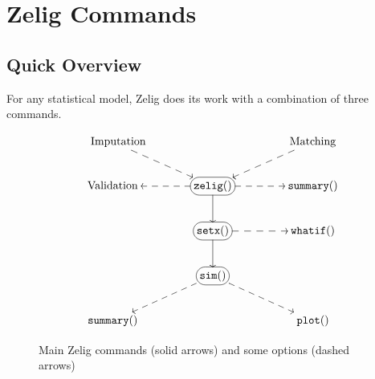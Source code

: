 \section{Zelig Commands}\label{Zcommands}
  
\subsection{Quick Overview}\label{overview}
  
For any statistical model, Zelig does its work with a combination of
three commands.  
\begin{figure}[h!]
\caption{Main Zelig commands (solid arrows) and some options (dashed arrows)}
\label{3steps}
\begin{center}
\begin{displaymath}
\SelectTips{eu}{12} \UseTips 
\xymatrix@!C{\quad {\rm Imputation}
\ar@{-->}[dr] & & {\rm Matching} \ar@{-->}[dl] \\ 
{\rm Validation } \ar@{<--}[r] & *+[F-:<10pt>]{{\tt zelig()}} \ar@{->}[d] \ar@{-->}[r] &
{\tt summary()}\\ 
 & *+[F-:<10pt>]{{\tt setx()}}  \ar@{-->}[r] \ar@{->}[d] & {\tt whatif()}\\ 
& *+[F-:<10pt>]{{\tt sim()}} \ar@{-->}[dr] \ar@{-->}[dl] & \\
{\tt summary()} & &{\tt plot()} } 
\end{displaymath}
\end{center}
\end{figure}

